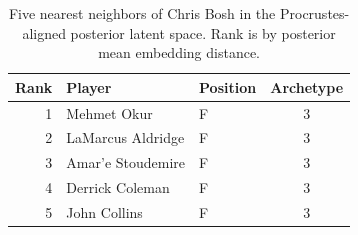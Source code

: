 \begin{table}[htbp]
  \centering\small
  \begin{tabular}{rllc}
    \toprule
    Rank & Player & Position & Archetype \\
    \midrule
    1 & Mehmet Okur & F & 3 \\
    2 & LaMarcus Aldridge & F & 3 \\
    3 & Amar'e Stoudemire & F & 3 \\
    4 & Derrick Coleman & F & 3 \\
    5 & John Collins & F & 3 \\
    \bottomrule
  \end{tabular}
  \caption{Five nearest neighbors of Chris Bosh in the Procrustes-aligned posterior latent space. Rank is by posterior mean embedding distance.}
  \label{tab:Chris_Bosh_neighbors}
\end{table}

